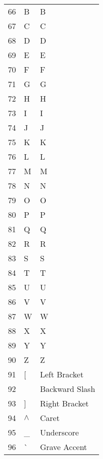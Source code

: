 \begin{description}
\begin{longtable}{lll}
      66 & B & B \\
      67 & C & C \\
      68 & D & D \\
      69 & E & E \\
      70 & F & F \\
      71 & G & G \\
      72 & H & H \\
      73 & I & I \\
      74 & J & J \\
      75 & K & K \\
      76 & L & L \\
      77 & M & M \\
      78 & N & N \\
      79 & O & O \\
      80 & P & P \\
      81 & Q & Q \\
      82 & R & R \\
      83 & S & S \\
      84 & T & T \\
      85 & U & U \\
      86 & V & V \\
      87 & W & W \\
      88 & X & X \\
      89 & Y & Y \\
      90 & Z & Z \\

      91 & [ & Left Bracket \\
      92 & \ & Backward Slash \\
      93 & ] & Right Bracket \\
      94 & $\wedge$ & Caret  \\
      95 & \_ & Underscore  \\
      96 & \`{} & Grave Accent   \\



\end{longtable}
\end{description}
